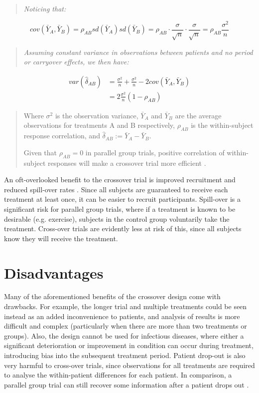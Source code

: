 \documentclass[12pt, TexShade, letterpaper]{report}
\begin{document}
\begin{quote}
    \textit{Noticing that:}
\end{quote}
\begin{equation*}
    cov(\bar{Y}_A, \bar{Y}_B)
= \rho_{AB}sd(\bar{Y}_A)sd(\bar{Y}_B) = \rho_{AB} \cdot \frac{\sigma}{\sqrt{n}} \cdot \frac{\sigma}{\sqrt{n}} = \rho_{AB}\frac{\sigma^2}{n}
\end{equation*}
\begin{quote}
    \textit{Assuming constant variance in observations between patients and no period or carryover effects, we then have:}
\end{quote}
\begin{align*}
    var(\hat{\delta}_{AB}) &=
    \frac{\sigma^2}{n} + \frac{\sigma^2}{n} - 2cov(\bar{Y}_A, \bar{Y}_B) \\
    &= 2\frac{\sigma^2}{n}(1-\rho_{AB})
\end{align*}
\begin{quote}
    Where $\sigma^2$ is the observation variance, $\bar{Y}_A$ and $\bar{Y}_B$ are the average observations for treatments A and B respectively, $\rho_{AB}$ is the within-subject response correlation, and $\hat{\delta}_{AB} := \bar{Y}_A - \bar{Y}_B$.

    Given that $\rho_{AB} = 0$ in parallel group trials, positive correlation of within-subject responses will make a crossover trial more efficient \cite{piantadosi2005clinical}.
\end{quote}

An oft-overlooked benefit to the crossover trial is improved recruitment and reduced spill-over rates \cite{piantadosi2005clinical}. Since all subjects are guaranteed to receive each treatment at least once, it can be easier to recruit participants. Spill-over is a significant risk for parallel group trials, where if a treatment is known to be desirable (e.g. exercise), subjects in the control group voluntarily take the treatment. Cross-over trials are evidently less at risk of this, since all subjects know they will receive the treatment.

\section{Disadvantages}
Many of the aforementioned benefits of the crossover design come with drawbacks. For example, the longer trial and multiple treatments could be seen instead as an added inconvenience to patients, and analysis of results is more difficult and complex (particularly when there are more than two treatments or groups). Also, the design cannot be used for infectious diseases, where either a significant deterioration or improvement in condition can occur during treatment, introducing bias into the subsequent treatment period. Patient drop-out is also very harmful to cross-over trials, since observations for all treatments are required to analyse the within-patient differences for each patient. In comparison, a parallel group trial can still recover some information after a patient drops out \cite{senn2002crossover}.
\end{document}
